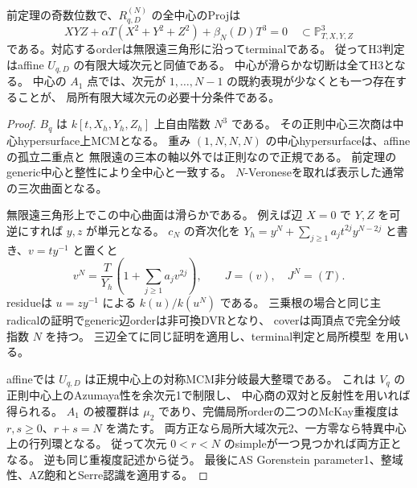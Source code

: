 \begin{lemma}[奇数位数の境界orderとaffine判定]
\label{lem:quantum-triangle-odd-boundary}
前定理の奇数位数で、$R_{q,D}^{(N)}$ の全中心のProjは
\[
 XYZ+\alpha T(X^2+Y^2+Z^2)+\beta_N(D)T^3=0
 \quad\subset\mathbb P^3_{T,X,Y,Z}
\]
である。対応するorderは無限遠三角形に沿ってterminalである。
従ってH3判定はaffine $U_{q,D}$ の有限大域次元と同値である。
中心が滑らかな切断は全てH3となる。
中心の $A_1$ 点では、次元が $1,\ldots,N-1$ の既約表現が少なくとも一つ存在することが、
局所有限大域次元の必要十分条件である。
\end{lemma}
\begin{proof}
$B_q$ は $k[t,X_h,Y_h,Z_h]$ 上自由階数 $N^3$ である。
その正則中心三次商は中心hypersurface上MCMとなる。
重み $(1,N,N,N)$ の中心hypersurfaceは、affineの孤立二重点と
無限遠の三本の軸以外では正則なので正規である。
前定理のgeneric中心と整性により全中心と一致する。
$N$-Veroneseを取れば表示した通常の三次曲面となる。

無限遠三角形上でこの中心曲面は滑らかである。
例えば辺 $X=0$ で $Y,Z$ を可逆にすれば $y,z$ が単元となる。
$c_N$ の斉次化を
$Y_h=y^N+\sum_{j\ge1}a_jt^{2j}y^{N-2j}$ と書き、$v=ty^{-1}$ と置くと
\[
 v^N=\frac{T}{Y_h}\left(1+\sum_{j\ge1}a_jv^{2j}\right),
 \qquad J=(v),\quad J^N=(T).
\]
residueは $u=zy^{-1}$ による $k(u)/k(u^N)$ である。
三乗根の場合と同じ主radicalの証明でgeneric辺orderは非可換DVRとなり、
coverは両頂点で完全分岐指数 $N$ を持つ。
三辺全てに同じ証明を適用し、terminal判定と局所模型
\cite[Theorems 2.7, 2.17]{CHIOrders}を用いる。

affineでは $U_{q,D}$ は正規中心上の対称MCM非分岐最大整環である。
これは $V_q$ の正則中心上のAzumaya性を余次元1で制限し、
中心商の双対と反射性を用いれば得られる。
$A_1$ の被覆群は $\mu_2$ であり、完備局所orderの二つのMcKay重複度は
$r,s\ge0$、$r+s=N$ を満たす。
両方正なら局所大域次元2、一方零なら特異中心上の行列環となる。
従って次元 $0<r<N$ のsimpleが一つ見つかれば両方正となる。
逆も同じ重複度記述から従う。
最後にAS Gorenstein parameter1、整域性、AZ飽和とSerre認識を適用する。
\end{proof}

